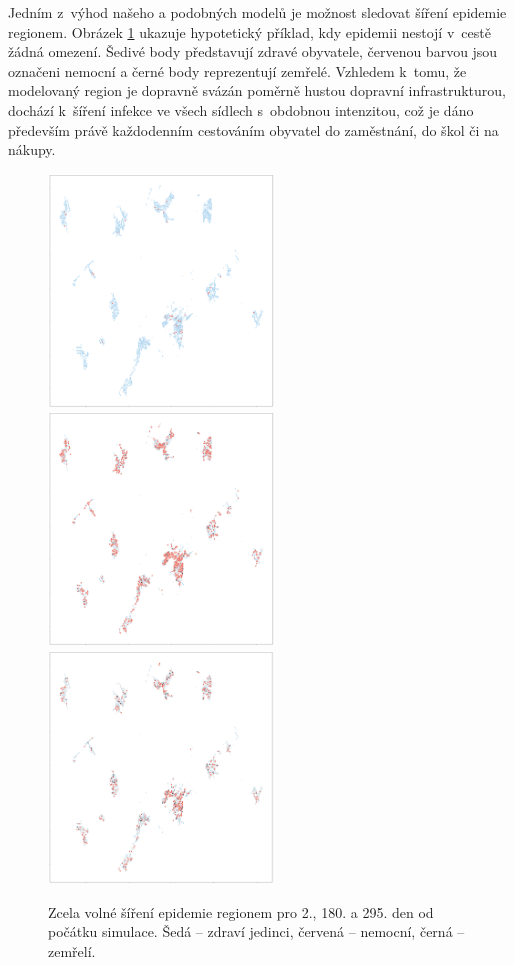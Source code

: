 Jedním z~výhod našeho a podobných modelů je možnost sledovat šíření epidemie regionem. Obrázek \ref{sireniepidemie} ukazuje hypotetický příklad, kdy epidemii nestojí v~cestě žádná omezení. Šedivé body představují zdravé obyvatele, červenou barvou jsou označeni nemocní a černé body reprezentují zemřelé. Vzhledem k~tomu, že modelovaný region je dopravně svázán poměrně hustou dopravní infrastrukturou, dochází k~šíření infekce ve všech sídlech s~obdobnou intenzitou, což je dáno především právě každodenním cestováním obyvatel do zaměstnání, do škol či na nákupy.

\begin{figure}
\begin{center}
\includegraphics[width=6cm]{pic/hodo002.png}
\includegraphics[width=6cm]{pic/hodo180.png}\\
\includegraphics[width=6cm]{pic/hodo295.png}
\end{center}
\caption{Zcela volné šíření epidemie regionem pro 2., 180. a 295. den od počátku simulace. Šedá -- zdraví jedinci, červená -- nemocní, černá -- zemřelí.}
\label{sireniepidemie}
\end{figure}

